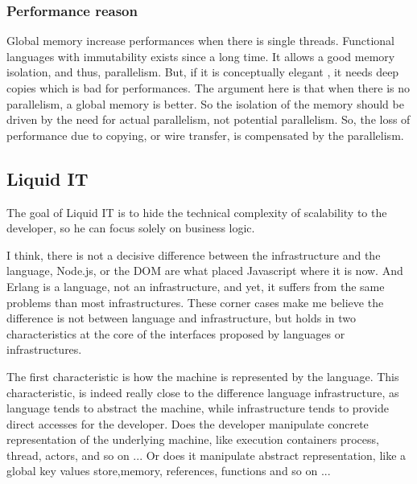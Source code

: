 \subsubsection{Performance reason}
Global memory increase performances when there is single threads.
Functional languages with immutability exists since a long time.
It allows a good memory isolation, and thus, parallelism.
But, if it is conceptually elegant , it needs deep copies which is bad for performances.
The argument here is that when there is no parallelism, a global memory is better.
So the isolation of the memory should be driven by the need for actual parallelism, not potential parallelism.
So, the loss of performance due to copying, or wire transfer, is compensated by the parallelism.












\subsection{Liquid IT}

The goal of Liquid IT is to hide the technical complexity of scalability to the developer, so he can focus solely on business logic.













I think, there is not a decisive difference between the infrastructure and the language, Node.js, or the DOM are what placed Javascript where it is now.
And Erlang is a language, not an infrastructure, and yet, it suffers from the same problems than most infrastructures.
These corner cases make me believe the difference is not between language and infrastructure, but holds in two characteristics at the core of the interfaces proposed by languages or infrastructures.

The first characteristic is how the machine is represented by the language.
This characteristic, is indeed really close to the difference language infrastructure, as language tends to abstract the machine, while infrastructure tends to provide direct accesses for the developer.
Does the developer manipulate concrete representation of the underlying machine, like execution containers process, thread, actors, and so on ...
Or does it manipulate abstract representation, like a global key values store,memory, references, functions and so on ...

